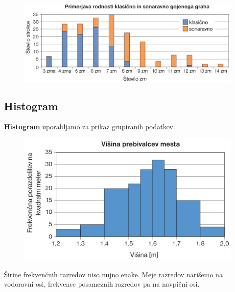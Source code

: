 \begin{figure}[H]
                    \includegraphics[scale=0.21]{../Slike_in_skice/1096.jpg}
                \end{figure}
            


        

        \newpage

        \subsection*{Histogram}

            \textbf{Histogram} uporabljamo za prikaz grupiranih podatkov. 
        
                \begin{figure}[H]
                    \includegraphics[scale=0.33]{../Slike_in_skice/1098.jpg}
                \end{figure}

        
            Širine frekvenčnih razredov niso nujno enake.
            Meje razredov narišemo na vodoravni osi, frekvence posameznih razredov pa na navpični osi.
        
        

                    


        


